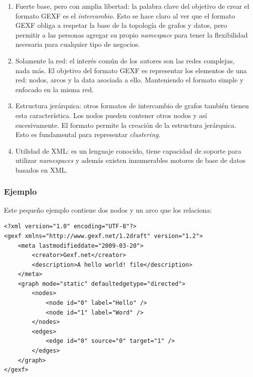 \documentclass[12pt,oneside,letterpaper]{book}
\newcommand{\eng}[1]{\textit{#1}\xspace}			%
\newcommand{\abr}[1]{\textsc{#1}\xspace}           %
\theoremstyle{definition}
\begin{document}
\begin{enumerate}
	\item Fuerte base, pero con amplia libertad: la palabra clave del objetivo de crear el formato \abr{GEXF} es el \emph{intercambio}. Esto se hace claro al ver que el formato \abr{GEXF} obliga a respetar la base de la topología de grafos y datos, pero permitir a las personas agregar su propio \eng{namespace} para tener la flexibilidad necesaria para cualquier tipo de negocios.
	\item Solamente la red: el interés común de los autores son las redes complejas, nada más. El objetivo del formato \abr{GEXF} es representar los elementos de una red: nodos, arcos y la data asociada a ello. Manteniendo el formato simple y enfocado en la misma red.
	\item Estructura jerárquica: otros formatos de intercambio de grafos también tienen esta característica. Los nodos pueden contener otros nodos y así sucesivamente. El formato permite la creación de la estructura jerárquica. Esto es fundamental para representar \eng{clustering}.
	\item Utilidad de \abr{XML}: es un lenguaje conocido, tiene capacidad de soporte para utilizar \eng{namespaces} y además existen innumerables motores de base de datos basados en XML.
\end{enumerate}

\subsubsection{Ejemplo}
Este pequeño ejemplo contiene dos nodos y un arco que los relaciona:

\begin{lstlisting}
<?xml version="1.0" encoding="UTF-8"?>
<gexf xmlns="http://www.gexf.net/1.2draft" version="1.2">
    <meta lastmodifieddate="2009-03-20">
        <creator>Gexf.net</creator>
        <description>A hello world! file</description>
    </meta>
    <graph mode="static" defaultedgetype="directed">
        <nodes>
            <node id="0" label="Hello" />
            <node id="1" label="Word" />
        </nodes>
        <edges>
            <edge id="0" source="0" target="1" />
        </edges>
    </graph>
</gexf>
\end{lstlisting}
\end{document}
